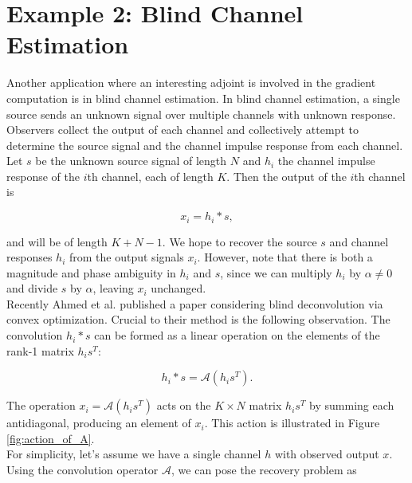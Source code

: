 \documentclass[journal]{IEEEtran}
\begin{document}


\section{Example 2: Blind Channel Estimation}
Another application where an interesting adjoint is involved in the gradient computation is in blind channel estimation.  In blind channel estimation, a single source sends an unknown signal over multiple channels with unknown response.  Observers collect the output of each channel and collectively attempt to determine the source signal and the channel impulse response from each channel.  Let $s$ be the unknown source signal of length $N$ and $h_i$ the channel impulse response of the $i$th channel, each of length $K$.  Then the output of the $i$th channel is

\[ x_i = h_i\ast s, \] 

\noindent and will be of length $K+N-1$.  We hope to recover the source $s$ and channel responses $h_i$ from the output signals $x_i$.   However, note that there is both a magnitude and phase ambiguity in $h_i$ and $s$, since we can multiply $h_i$ by $\alpha\neq 0$ and divide $s$ by $\alpha$, leaving $x_i$ unchanged.\\

Recently Ahmed et al. \cite{ahmed_2013} published a paper considering blind deconvolution via convex optimization.  Crucial to their method is the following observation.  The convolution $h_i\ast s$ can be formed as a linear operation on the elements of the rank-1 matrix $h_is^T$:

\[ h_i\ast s = \mathcal{A}(h_is^T). \] 

\noindent The operation $x_i=\mathcal{A}(h_is^T)$ acts on the $K\times N$ matrix $h_is^T$ by summing each antidiagonal, producing an element of $x_i$.  This action is illustrated in Figure \ref{fig:action_of_A}.\\

For simplicity, let's assume we have a single channel $h$ with observed output $x$.  Using the convolution operator $\mathcal{A}$, we can pose the recovery problem as
\end{document}
